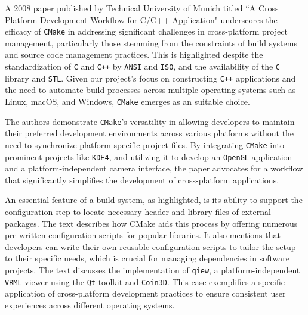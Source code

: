 A 2008 paper published by Technical University of Munich titled  ``A Cross Platform Development Workflow for C/C++ Application"\cite{cmake_publication_1} underscores the efficacy of \texttt{CMake} in addressing significant challenges in cross-platform project management, particularly those stemming from the constraints of build systems and source code management practices. This is highlighted despite the standardization of \texttt{C} and \texttt{C++} by \texttt{ANSI} and \texttt{ISO}, and the availability of the \texttt{C} library and \texttt{STL}. Given our project's focus on constructing \texttt{C++} applications and the need to automate build processes across multiple operating systems such as Linux, macOS, and Windows, \texttt{CMake} emerges as an suitable choice. 

The authors demonstrate \texttt{CMake}'s versatility in allowing developers to maintain their preferred development environments across various platforms without the need to synchronize platform-specific project files. By integrating \texttt{CMake} into prominent projects like \texttt{KDE4}, and utilizing it to develop an \texttt{OpenGL} application and a platform-independent camera interface, the paper advocates for a workflow that significantly simplifies the development of cross-platform applications.

An essential feature of a build system, as highlighted, is its ability to support the configuration step to locate necessary header and library files of external packages. The text describes how CMake aids this process by offering numerous pre-written configuration scripts for popular libraries. It also mentions that developers can write their own reusable configuration scripts to tailor the setup to their specific needs, which is crucial for managing dependencies in software projects. The text discusses the implementation of \texttt{qiew}, a platform-independent \texttt{VRML} viewer using the \texttt{Qt} toolkit and \texttt{Coin3D}. This case exemplifies a specific application of cross-platform development practices to ensure consistent user experiences across different operating systems.

